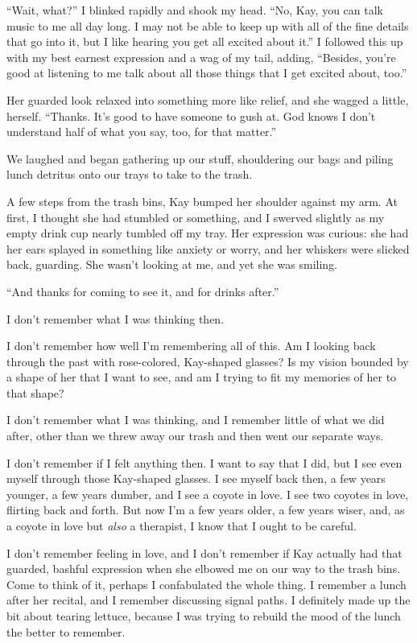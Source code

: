 ``Wait, what?'' I blinked rapidly and shook my head. ``No, Kay, you can talk music to me all day long. I may not be able to keep up with all of the fine details that go into it, but I like hearing you get all excited about it.'' I followed this up with my best earnest expression and a wag of my tail, adding, ``Besides, you're good at listening to me talk about all those things that I get excited about, too.''

Her guarded look relaxed into something more like relief, and she wagged a little, herself. ``Thanks. It's good to have someone to gush at. God knows I don't understand half of what you say, too, for that matter.''

We laughed and began gathering up our stuff, shouldering our bags and piling lunch detritus onto our trays to take to the trash.

A few steps from the trash bins, Kay bumped her shoulder against my arm. At first, I thought she had stumbled or something, and I swerved slightly as my empty drink cup nearly tumbled off my tray. Her expression was curious: she had her ears splayed in something like anxiety or worry, and her whiskers were slicked back, guarding. She wasn't looking at me, and yet she was smiling.

``And thanks for coming to see it, and for drinks after.''

I don't remember what I was thinking then.

I don't remember how well I'm remembering all of this. Am I looking back through the past with rose-colored, Kay-shaped glasses? Is my vision bounded by a shape of her that I want to see, and am I trying to fit my memories of her to that shape?

I don't remember what I was thinking, and I remember little of what we did after, other than we threw away our trash and then went our separate ways.

I don't remember if I felt anything then. I want to say that I did, but I see even myself through those Kay-shaped glasses. I see myself back then, a few years younger, a few years dumber, and I see a coyote in love. I see two coyotes in love, flirting back and forth. But now I'm a few years older, a few years wiser, and, as a coyote in love but \emph{also} a therapist, I know that I ought to be careful.

I don't remember feeling in love, and I don't remember if Kay actually had that guarded, bashful expression when she elbowed me on our way to the trash bins. Come to think of it, perhaps I confabulated the whole thing. I remember a lunch after her recital, and I remember discussing signal paths. I definitely made up the bit about tearing lettuce, because I was trying to rebuild the mood of the lunch the better to remember.

